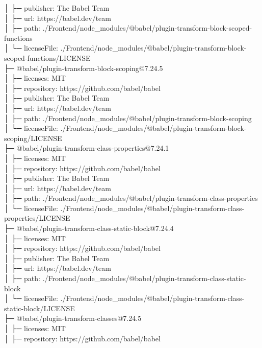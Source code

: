 │  ├─ publisher: The Babel Team\\
│  ├─ url: https://babel.dev/team\\
│  ├─ path: ./Frontend/node\_modules/@babel/plugin-transform-block-scoped-functions\\
│  └─ licenseFile: ./Frontend/node\_modules/@babel/plugin-transform-block-scoped-functions/LICENSE\\
├─ @babel/plugin-transform-block-scoping@7.24.5\\
│  ├─ licenses: MIT\\
│  ├─ repository: https://github.com/babel/babel\\
│  ├─ publisher: The Babel Team\\
│  ├─ url: https://babel.dev/team\\
│  ├─ path: ./Frontend/node\_modules/@babel/plugin-transform-block-scoping\\
│  └─ licenseFile: ./Frontend/node\_modules/@babel/plugin-transform-block-scoping/LICENSE\\
├─ @babel/plugin-transform-class-properties@7.24.1\\
│  ├─ licenses: MIT\\
│  ├─ repository: https://github.com/babel/babel\\
│  ├─ publisher: The Babel Team\\
│  ├─ url: https://babel.dev/team\\
│  ├─ path: ./Frontend/node\_modules/@babel/plugin-transform-class-properties\\
│  └─ licenseFile: ./Frontend/node\_modules/@babel/plugin-transform-class-properties/LICENSE\\
├─ @babel/plugin-transform-class-static-block@7.24.4\\
│  ├─ licenses: MIT\\
│  ├─ repository: https://github.com/babel/babel\\
│  ├─ publisher: The Babel Team\\
│  ├─ url: https://babel.dev/team\\
│  ├─ path: ./Frontend/node\_modules/@babel/plugin-transform-class-static-block\\
│  └─ licenseFile: ./Frontend/node\_modules/@babel/plugin-transform-class-static-block/LICENSE\\
├─ @babel/plugin-transform-classes@7.24.5\\
│  ├─ licenses: MIT\\
│  ├─ repository: https://github.com/babel/babel\\
